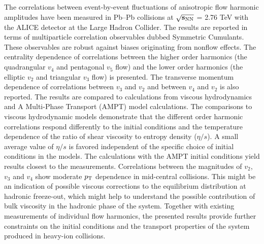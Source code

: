 The correlations between event-by-event fluctuations of anisotropic flow harmonic amplitudes
have been measured in Pb--Pb collisions at $\mathbf{\sqrt{s_{\rm NN}}}$ = 2.76 TeV with the ALICE detector at the Large Hadron Collider. 
The results are reported in terms of multiparticle correlation observables dubbed Symmetric Cumulants.
These observables are robust against biases originating from nonflow effects. 
The centrality dependence of correlations between the higher order harmonics (the quadrangular $v_4$ and pentagonal $v_5$ flow) and the lower order harmonics (the elliptic $v_2$ and triangular $v_3$ flow)
is presented. The transverse momentum dependence of correlations between $v_3$ and $v_2$ and between $v_4$ and $v_2$ is also reported. 
The results are compared to calculations from viscous hydrodynamics and  A Multi-Phase Transport ({AMPT}) model calculations.
The comparisons to viscous hydrodynamic models demonstrate that
the different order harmonic correlations respond differently to the initial conditions and the temperature dependence of the ratio of shear viscosity to entropy density ($\eta/s$). 
A small average value of $\eta/s$ is favored independent of the specific choice of initial conditions in the models. The calculations with the AMPT initial conditions yield results closest to the measurements. 
Correlations between the magnitudes of $v_2$, $v_3$ and $v_4$ show moderate $p_{\rm T}$ dependence in mid-central collisions. This might be an indication of possible viscous corrections to the equilibrium distribution at hadronic freeze-out, which might help to understand the possible contribution of bulk viscosity in the hadronic phase of the system.
Together with existing measurements of individual flow harmonics, the presented results provide further constraints 
on the initial conditions and the transport properties of the system produced in heavy-ion collisions.
